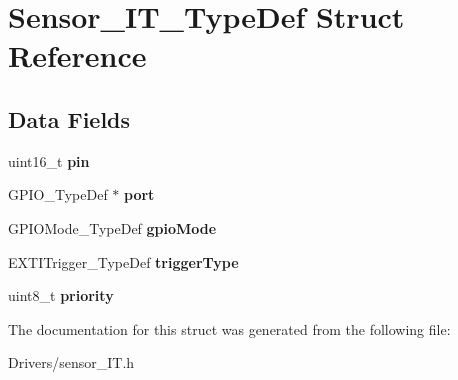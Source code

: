 \hypertarget{struct_sensor___i_t___type_def}{}\section{Sensor\+\_\+\+I\+T\+\_\+\+Type\+Def Struct Reference}
\label{struct_sensor___i_t___type_def}
\subsection*{Data Fields}
\begin{DoxyCompactItemize}
\item 
\mbox{\label{struct_sensor___i_t___type_def_a4144813adfa4dfe7e7cbeea17d1b06eb}} 
uint16\+\_\+t {\bfseries pin}
\item 
\mbox{\label{struct_sensor___i_t___type_def_a82241972e0292c7de95ea1e293e11be3}} 
G\+P\+I\+O\+\_\+\+Type\+Def $\ast$ {\bfseries port}
\item 
\mbox{\label{struct_sensor___i_t___type_def_afa8578d9bd7179c1b9c23da9f99734d3}} 
G\+P\+I\+O\+Mode\+\_\+\+Type\+Def {\bfseries gpio\+Mode}
\item 
\mbox{\label{struct_sensor___i_t___type_def_a6625b6963fd4f630224d40f04877bd21}} 
E\+X\+T\+I\+Trigger\+\_\+\+Type\+Def {\bfseries trigger\+Type}
\item 
\mbox{\label{struct_sensor___i_t___type_def_a0ad043071ccc7a261d79a759dc9c6f0c}} 
uint8\+\_\+t {\bfseries priority}
\end{DoxyCompactItemize}


The documentation for this struct was generated from the following file\+:\begin{DoxyCompactItemize}
\item 
Drivers/sensor\+\_\+\+I\+T.\+h\end{DoxyCompactItemize}
